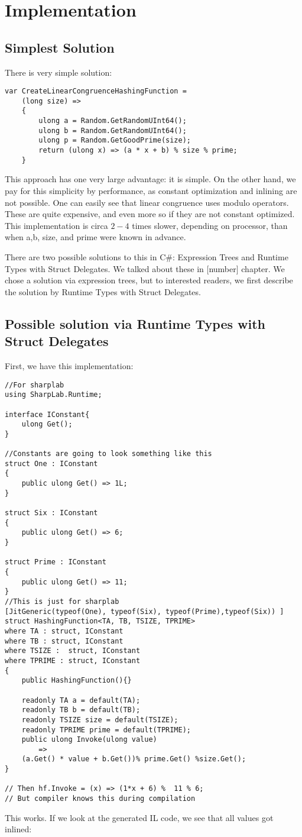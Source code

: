 \section{Implementation}
\subsection{Simplest Solution}
There is very simple solution:
\begin{lstlisting}
var CreateLinearCongruenceHashingFunction = 
    (long size) =>
    {
        ulong a = Random.GetRandomUInt64();
        ulong b = Random.GetRandomUInt64();
        ulong p = Random.GetGoodPrime(size);
        return (ulong x) => (a * x + b) % size % prime;
    }
\end{lstlisting}
This approach has one very large advantage: it is simple. On the other hand, we pay for this simplicity by performance, as constant optimization and inlining are not possible. One can easily see that linear congruence uses modulo operators. These are quite expensive, and even more so if they are not constant optimized. This implementation is circa $2-4$ times slower, depending on processor, than when a,b, size, and prime were known in advance.

There are two possible solutions to this in C\#: Expression Trees and Runtime Types with Struct Delegates. We talked about these in [number] chapter. We chose a solution via expression trees, but to interested readers, we first describe the solution by Runtime Types with Struct Delegates. 

\subsection{Possible solution via Runtime Types with Struct Delegates}
First, we have this implementation:
\begin{lstlisting}
//For sharplab
using SharpLab.Runtime; 

interface IConstant{
    ulong Get();
}

//Constants are going to look something like this
struct One : IConstant
{
    public ulong Get() => 1L; 
}

struct Six : IConstant
{
    public ulong Get() => 6; 
}

struct Prime : IConstant
{
    public ulong Get() => 11; 
}
//This is just for sharplab
[JitGeneric(typeof(One), typeof(Six), typeof(Prime),typeof(Six)) ]
struct HashingFunction<TA, TB, TSIZE, TPRIME> 
where TA : struct, IConstant
where TB : struct, IConstant
where TSIZE :  struct, IConstant
where TPRIME : struct, IConstant
{
    public HashingFunction(){}
    
    readonly TA a = default(TA);
    readonly TB b = default(TB);
    readonly TSIZE size = default(TSIZE);
    readonly TPRIME prime = default(TPRIME);
    public ulong Invoke(ulong value) 
        => 
    (a.Get() * value + b.Get())% prime.Get() %size.Get();
} 

// Then hf.Invoke = (x) => (1*x + 6) %  11 % 6;
// But compiler knows this during compilation
\end{lstlisting}
This works. If we look at the generated IL code, we see that all values got inlined:

